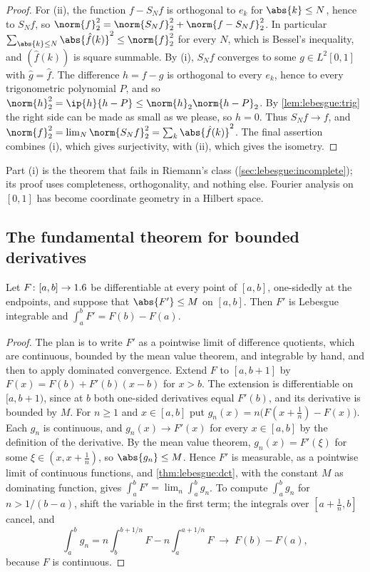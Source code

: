 \begin{refsection}
\begin{proof}
For (ii), the function $f-S_Nf$ is orthogonal to $e_k$ for $\abs{k}\le N$, hence to $S_Nf$, so $\norm{f}_2^2=\norm{S_Nf}_2^2+\norm{f-S_Nf}_2^2$. In particular $\sum_{\abs{k}\le N}\abs{\hat f(k)}^2\le\norm{f}_2^2$ for every $N$, which is Bessel's inequality, and $(\hat f(k))$ is square summable. By (i), $S_Nf$ converges to some $g\in L^2[0,1]$ with $\hat g=\hat f$. The difference $h=f-g$ is orthogonal to every $e_k$, hence to every trigonometric polynomial $P$, and so $\norm{h}_2^2=\ip{h}{h-P}\le\norm{h}_2\norm{h-P}_2$. By \cref{lem:lebesgue:trig} the right side can be made as small as we please, so $h=0$. Thus $S_Nf\to f$, and $\norm{f}_2^2=\lim_N\norm{S_Nf}_2^2=\sum_k\abs{\hat f(k)}^2$. The final assertion combines (i), which gives surjectivity, with (ii), which gives the isometry.
\end{proof}

Part (i) is the theorem that fails in Riemann's class (\cref{sec:lebesgue:incomplete}); its proof uses completeness, orthogonality, and nothing else. Fourier analysis on $[0,1]$ has become coordinate geometry in a Hilbert space.

\subsection{The fundamental theorem for bounded derivatives}\label{sec:lebesgue:ftc}

\begin{theorem}\label{thm:lebesgue:ftc}
Let $F\colon[a,b]\to1.6$ be differentiable at every point of $[a,b]$, one-sidedly at the endpoints, and suppose that $\abs{F'}\le M$ on $[a,b]$. Then $F'$ is Lebesgue integrable and $\int_a^bF'=F(b)-F(a)$.
\end{theorem}

\begin{proof}
The plan is to write $F'$ as a pointwise limit of difference quotients, which are continuous, bounded by the mean value theorem, and integrable by hand, and then to apply dominated convergence. Extend $F$ to $[a,b+1]$ by $F(x)=F(b)+F'(b)(x-b)$ for $x>b$. The extension is differentiable on $[a,b+1)$, since at $b$ both one-sided derivatives equal $F'(b)$, and its derivative is bounded by $M$. For $n\ge1$ and $x\in[a,b]$ put $g_n(x)=n\bigl(F(x+\frac1n)-F(x)\bigr)$. Each $g_n$ is continuous, and $g_n(x)\to F'(x)$ for every $x\in[a,b]$ by the definition of the derivative. By the mean value theorem, $g_n(x)=F'(\xi)$ for some $\xi\in(x,x+\frac1n)$, so $\abs{g_n}\le M$. Hence $F'$ is measurable, as a pointwise limit of continuous functions, and \cref{thm:lebesgue:dct}, with the constant $M$ as dominating function, gives $\int_a^bF'=\lim_n\int_a^bg_n$. To compute $\int_a^bg_n$ for $n>1/(b-a)$, shift the variable in the first term; the integrals over $[a+\frac1n,b]$ cancel, and
\[
  \int_a^bg_n=n\int_b^{b+1/n}F-n\int_a^{a+1/n}F\;\longrightarrow\;F(b)-F(a),
\]
because $F$ is continuous.
\end{proof}


\end{refsection}
